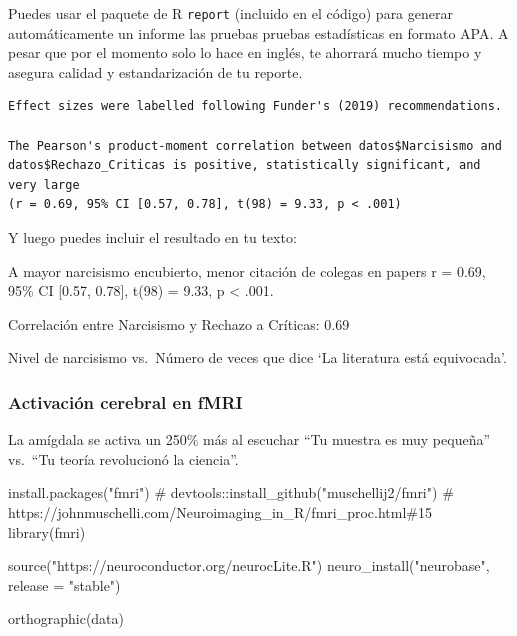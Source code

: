 \documentclass[
  10pt]{article}
\newenvironment{Shaded}{\begin{snugshade}}{\end{snugshade}}
\newcommand{\AttributeTok}[1]{\textcolor[rgb]{0.40,0.45,0.13}{#1}}
\newcommand{\CommentTok}[1]{\textcolor[rgb]{0.37,0.37,0.37}{#1}}
\newcommand{\FunctionTok}[1]{\textcolor[rgb]{0.28,0.35,0.67}{#1}}
\newcommand{\NormalTok}[1]{\textcolor[rgb]{0.00,0.23,0.31}{#1}}
\newcommand{\StringTok}[1]{\textcolor[rgb]{0.13,0.47,0.30}{#1}}
\begin{document}
\begin{tcolorbox}[enhanced jigsaw, colframe=quarto-callout-tip-color-frame, toprule=.15mm, opacitybacktitle=0.6, arc=.35mm, coltitle=black, title=\textcolor{quarto-callout-tip-color}{\faLightbulb}\hspace{0.5em}{Tip}, breakable, rightrule=.15mm, bottomtitle=1mm, titlerule=0mm, leftrule=.75mm, opacityback=0, colbacktitle=quarto-callout-tip-color!10!white, colback=white, left=2mm, bottomrule=.15mm, toptitle=1mm]

Puedes usar el paquete de R \texttt{report} (incluido en el código) para
generar automáticamente un informe las pruebas pruebas estadísticas en
formato APA. A pesar que por el momento solo lo hace en inglés, te
ahorrará mucho tiempo y asegura calidad y estandarización de tu reporte.

\begin{verbatim}
Effect sizes were labelled following Funder's (2019) recommendations.

The Pearson's product-moment correlation between datos$Narcisismo and
datos$Rechazo_Criticas is positive, statistically significant, and very large
(r = 0.69, 95% CI [0.57, 0.78], t(98) = 9.33, p < .001)
\end{verbatim}

Y luego puedes incluir el resultado en tu texto:

A mayor narcisismo encubierto, menor citación de colegas en papers r =
0.69, 95\% CI {[}0.57, 0.78{]}, t(98) = 9.33, p \textless{} .001.

\end{tcolorbox}

Correlación entre Narcisismo y Rechazo a Críticas: 0.69

Nivel de narcisismo vs.~Número de veces que dice `La literatura está
equivocada'.

\subsubsection{Activación cerebral en
fMRI}\label{activaciuxf3n-cerebral-en-fmri}

La amígdala se activa un 250\% más al escuchar ``Tu muestra es muy
pequeña'' vs.~``Tu teoría revolucionó la ciencia''.

\begin{Shaded}
\begin{Highlighting}[]
\FunctionTok{install.packages}\NormalTok{(}\StringTok{"fmri"}\NormalTok{)}
\CommentTok{\# devtools::install\_github("muschellij2/fmri")}
\CommentTok{\# https://johnmuschelli.com/Neuroimaging\_in\_R/fmri\_proc.html\#15}
\FunctionTok{library}\NormalTok{(fmri)}

\FunctionTok{source}\NormalTok{(}\StringTok{"https://neuroconductor.org/neurocLite.R"}\NormalTok{)}
\FunctionTok{neuro\_install}\NormalTok{(}\StringTok{"neurobase"}\NormalTok{, }\AttributeTok{release =} \StringTok{"stable"}\NormalTok{)}

\FunctionTok{orthographic}\NormalTok{(data)}
\end{Highlighting}
\end{Shaded}
\end{document}

